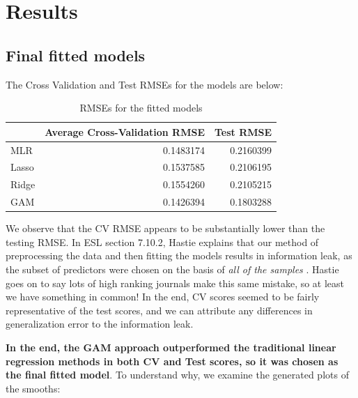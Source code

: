 \documentclass[aoas]{imsart}
\numberwithin{equation}{section}
\theoremstyle{plain}
\theoremstyle{remark}
\begin{document}
\hypertarget{results}{%
\section{Results}\label{results}}

\hypertarget{final-fitted-models}{%
\subsection{Final fitted models}\label{final-fitted-models}}

The Cross Validation and Test RMSEs for the models are below:

\begin{table}[H]

\caption{\label{tab:unnamed-chunk-6}RMSEs for the fitted models}
\centering
\begin{tabular}[t]{lrr}
\hline
  & Average Cross-Validation RMSE & Test RMSE\\
\hline
MLR & 0.1483174 & 0.2160399\\
Lasso & 0.1537585 & 0.2106195\\
Ridge & 0.1554260 & 0.2105215\\
GAM & 0.1426394 & 0.1803288\\
\hline
\end{tabular}
\end{table}

We observe that the CV RMSE appears to be substantially lower than the
testing RMSE. In ESL section 7.10.2, Hastie explains that our method of
preprocessing the data and then fitting the models results in
information leak, as the subset of predictors were chosen on the basis
of \emph{all of the samples} \citep{hastie01statisticallearning}. Hastie
goes on to say lots of high ranking journals make this same mistake, so
at least we have something in common! In the end, CV scores seemed to be
fairly representative of the test scores, and we can attribute any
differences in generalization error to the information leak.

\textbf{In the end, the GAM approach outperformed the traditional linear
regression methods in both CV and Test scores, so it was chosen as the
final fitted model}. To understand why, we examine the generated plots
of the smooths:
\end{document}
